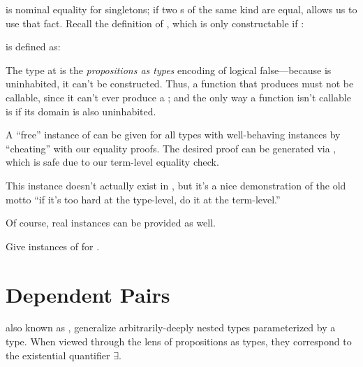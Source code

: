 \documentclass[book.tex]{subfiles}
\begin{document}
 is \gls{nominal} equality for singletons; if two s of the
same kind are equal,  allows us to use that fact. Recall the
definition of , which is only constructable if :


 is defined as:


The type  at  is the \emph{propositions as types}
 encoding of logical false---because  is
uninhabited, it can't be constructed. Thus, a function that produces 
must not be callable, since it can't ever produce a ; and the only way
a function isn't callable is if its domain is also uninhabited.

A ``free'' instance of  can be given for all types with
well-behaving  instances by ``cheating'' with our equality proofs. The
desired  proof can be generated via , which is
safe due to our term-level equality check.


This instance doesn't actually exist in , but it's a nice
demonstration of the old motto ``if it's too hard at the type-level, do it at
the term-level.''

Of course, real instances can be provided as well.


\begin{exercise}
Give instances of  for .
\end{exercise}
\begin{solution}
\end{solution}


\section{Dependent Pairs}


 also known as , generalize arbitrarily-deeply nested  types parameterized by a
type. When viewed through the lens of propositions as types, they correspond to
the existential quantifier $\exists$.
\end{document}
